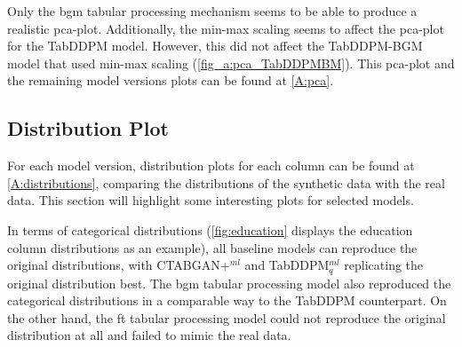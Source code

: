 Only the \gls{bgm} tabular processing mechanism seems to be able to produce a realistic \gls{pca}-plot.
Additionally, the min-max scaling seems to affect the \gls{pca}-plot for the TabDDPM model.
However, this did not affect the TabDDPM-BGM model that used min-max scaling (\autoref{fig_a:pca_TabDDPMBM}).
This \gls{pca}-plot and the remaining model versions plots can be found at \autoref{A:pca}.

\subsection{Distribution Plot}
\label{ch:results-Distr}

For each model version, distribution plots for each column can be found at \autoref{A:distributions}, comparing the distributions of the synthetic data with the real data.
This section will highlight some interesting plots for selected models.

In terms of categorical distributions (\autoref{fig:education} displays the education column distributions as an example), all baseline models can reproduce the original distributions,
with CTABGAN+$^{ml}$ and TabDDPM$^{ml}_q$ replicating the original distribution best.
The \gls{bgm} tabular processing model also reproduced the categorical distributions in a comparable way to the TabDDPM counterpart.
On the other hand, the \gls{ft} tabular processing model could not reproduce the original distribution at all and failed to mimic the real data.

